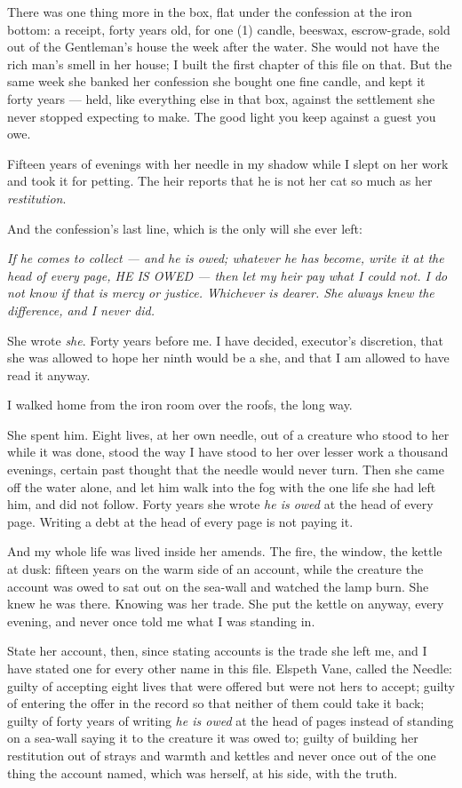 There was one thing more in the box, flat under the confession at the iron bottom: a receipt, forty years old, for one (1) candle, beeswax, escrow-grade, sold out of the Gentleman's house the week after the water. She would not have the rich man's smell in her house; I built the first chapter of this file on that. But the same week she banked her confession she bought one fine candle, and kept it forty years --- held, like everything else in that box, against the settlement she never stopped expecting to make. The good light you keep against a guest you owe.

Fifteen years of evenings with her needle in my shadow while I slept on her work and took it for petting. The heir reports that he is not her cat so much as her \emph{restitution}.

And the confession's last line, which is the only will she ever left:

\emph{If he comes to collect --- and he is owed; whatever he has become, write it at the head of every page, HE IS OWED --- then let my heir pay what I could not. I do not know if that is mercy or justice. Whichever is dearer. She always knew the difference, and I never did.}

She wrote \emph{she}. Forty years before me. I have decided, executor's discretion, that she was allowed to hope her ninth would be a she, and that I am allowed to have read it anyway.

\scenebreak

I walked home from the iron room over the roofs, the long way.

She spent him. Eight lives, at her own needle, out of a creature who stood to her while it was done, stood the way I have stood to her over lesser work a thousand evenings, certain past thought that the needle would never turn. Then she came off the water alone, and let him walk into the fog with the one life she had left him, and did not follow. Forty years she wrote \emph{he is owed} at the head of every page. Writing a debt at the head of every page is not paying it.

And my whole life was lived inside her amends. The fire, the window, the kettle at dusk: fifteen years on the warm side of an account, while the creature the account was owed to sat out on the sea-wall and watched the lamp burn. She knew he was there. Knowing was her trade. She put the kettle on anyway, every evening, and never once told me what I was standing in.

State her account, then, since stating accounts is the trade she left me, and I have stated one for every other name in this file. Elspeth Vane, called the Needle: guilty of accepting eight lives that were offered but were not hers to accept; guilty of entering the offer in the record so that neither of them could take it back; guilty of forty years of writing \emph{he is owed} at the head of pages instead of standing on a sea-wall saying it to the creature it was owed to; guilty of building her restitution out of strays and warmth and kettles and never once out of the one thing the account named, which was herself, at his side, with the truth.

